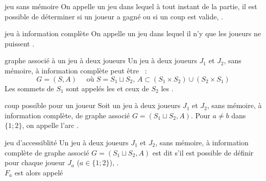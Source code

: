 

\begin{adjustwidth}{-3cm}{-3cm}


\begin{definition}{4.1}{jeu sans mémoire}
    On appelle  un jeu dans lequel à tout instant de la partie, il est possible de déterminer si un joueur a gagné ou si un coup est valide, .
\end{definition}

\begin{definition}{4.2}{jeu à information complète}
    On appelle  un jeu dans lequel il n'y  que les joueurs ne puissent .
\end{definition}

\begin{definition}{4.3}{graphe associé à un jeu à deux joueurs}
    Un jeu à deux joueurs $J_1$ et $J_2$, sans mémoire, à information complète peut être ~:
    $$G = (S,A) \quad \text{ où } S = S_1 \sqcup S_2,\, A \subset (S_1 \times S_2) \cup (S_2 \times S_1) $$
    Les sommets de $S_1$ sont appelés les  et ceux de $S_2$ les .
\end{definition}

\begin{definition}{4.4}{coup possible pour un joueur}
    Soit un jeu à deux joueurs $J_1$ et $J_2$, sans mémoire, à information complète, de graphe associé $G=(S_1 \sqcup S_2,A)$. Pour $a \neq b$ dans $\{1;2\}$, on appelle l'arc .
\end{definition}

\begin{definition}{4.5}{jeu d'accessiblité}
    Un jeu à deux joueurs $J_1$ et $J_2$, sans mémoire, à information complète de graphe associé $G=(S_1 \sqcup S_2,A)$ est dit  s'il est possible de définir pour chaque joueur $J_a$ ($a \in \{1;2\}$), . \\$F_a$ est alors appelé 
\end{definition}


\end{adjustwidth}
